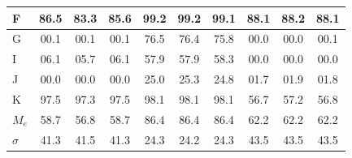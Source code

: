 \documentclass[c]{beamer}
\begin{document}
\begin{darkframes}
\begin{frame}{}
\begin{table}[!b]
{\begin{tabularx}{\textwidth}{Xccccccccc}
          {F}        & 86.5                                  & 83.3                                    & 85.6                                  & 99.2    & 99.2    & 99.1    & 88.1    & 88.2    & 88.1    \\ \hline
          {G}        & 00.1                                  & 00.1                                    & 00.1                                  & 76.5    & 76.4    & 75.8    & 00.0    & 00.0    & 00.1    \\ \hline
          {I}        & 06.1                                  & 05.7                                    & 06.1                                  & 57.9    & 57.9    & 58.3    & 00.0    & 00.0    & 00.0    \\ \hline
          {J}        & 00.0                                  & 00.0                                    & 00.0                                  & 25.0    & 25.3    & 24.8    & 01.7    & 01.9    & 01.8    \\ \hline
          {K}        & 97.5                                  & 97.3                                    & 97.5                                  & 98.1    & 98.1    & 98.1    & 56.7    & 57.2    & 56.8    \\ \hline
          {$M_e$}    & 58.7                                  & 56.8                                    & 58.7                                  & 86.4    & 86.4    & 86.4    & 62.2    & 62.2    & 62.2    \\ \hline
          {$\sigma$} & 41.3                                  & 41.5                                    & 41.3                                  & 24.3    & 24.2    & 24.3    & 43.5    & 43.5    & 43.5    \\ \hline
        \end{tabularx}}
    \end{table}
  \end{frame}



\end{darkframes}
\end{document}
